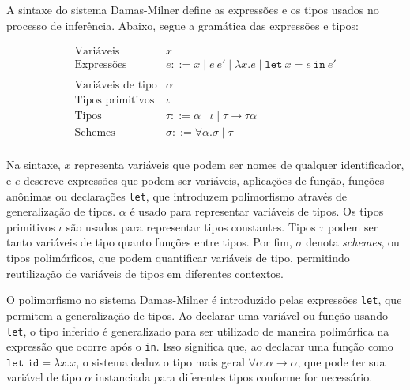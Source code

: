 A sintaxe do sistema Damas-Milner define as expressões e os tipos usados no processo de inferência.
Abaixo, segue a gramática das expressões e tipos:

\begin{equation}\label{eq:dm-syntax}
  \begin{array}{ll}
    \text{Variáveis}         & x                                                                                 \\
    \text{Expressões}        & e ::= x \mid e \ e' \mid \lambda x.e \mid \texttt{let} \ x = e \ \texttt{in} \ e' \\
    \\
    \text{Variáveis de tipo} & \alpha                                                                            \\
    \text{Tipos primitivos}  & \iota                                                                             \\
    \text{Tipos}             & \tau ::= \alpha \mid \iota \mid \tau \rightarrow \tau
    \alpha                                                                                                       \\
    \text{Schemes}           & \sigma ::= \forall \alpha. \sigma \mid \tau                                       \\
  \end{array}
\end{equation}

Na sintaxe, $x$ representa variáveis que podem ser nomes de qualquer identificador, e $e$ descreve expressões que podem ser variáveis, aplicações de função, funções anônimas ou declarações \texttt{let}, que introduzem polimorfismo através de generalização de tipos.
$\alpha$ é usado para representar variáveis de tipos.
Os tipos primitivos $\iota$ são usados para representar tipos constantes.
Tipos $\tau$ podem ser tanto variáveis de tipo quanto funções entre tipos.
Por fim, $\sigma$ denota \textit{schemes}, ou tipos polimórficos, que podem quantificar variáveis de tipo, permitindo reutilização de variáveis de tipos em diferentes contextos.

O polimorfismo no sistema Damas-Milner é introduzido pelas expressões \texttt{let}, que permitem a generalização de tipos.
Ao declarar uma variável ou função usando \texttt{let}, o tipo inferido é generalizado para ser utilizado de maneira polimórfica na expressão que ocorre após o \texttt{in}.
Isso significa que, ao declarar uma função como $\texttt{let id} = \lambda x.x$, o sistema deduz o tipo mais geral $\forall \alpha. \alpha \rightarrow \alpha$, que pode ter sua variável de tipo $\alpha$ instanciada para diferentes tipos conforme for necessário.

